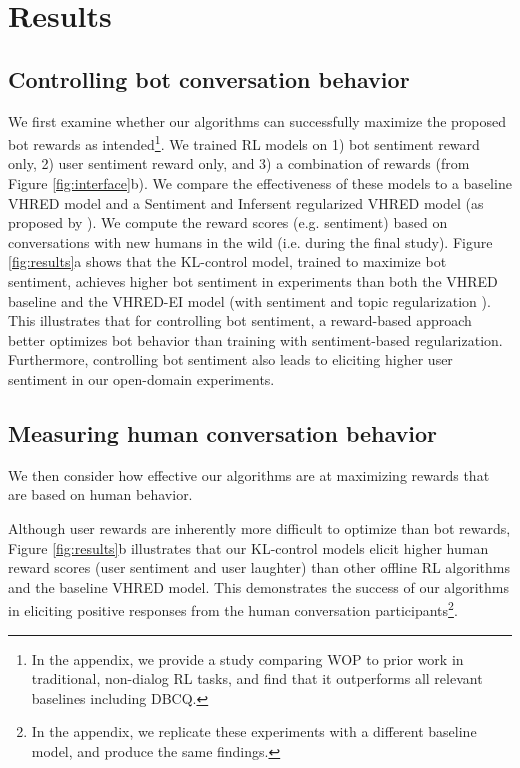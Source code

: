 \section{Results}
\label{sec:results}
\subsection{Controlling bot conversation behavior} We first examine whether our algorithms can successfully maximize the proposed bot rewards as intended\footnote{In the appendix, we provide a study comparing WOP to prior work in traditional, non-dialog RL tasks, and find that it outperforms all relevant baselines including DBCQ.}. We trained RL models on 1) bot sentiment reward only, 2) user sentiment reward only, and 3) a combination of rewards (from Figure \ref{fig:interface}b). We compare the effectiveness of these models to a baseline VHRED model and a Sentiment and Infersent regularized VHRED model (as proposed by \citet{ghandeharioun2019approximating}). We compute the reward scores (e.g. sentiment) based on conversations with new humans in the wild (i.e. during the final study). Figure \ref{fig:results}a shows that the KL-control model, trained to maximize bot sentiment, achieves higher bot sentiment in experiments than both the VHRED baseline and the VHRED-EI model (with sentiment and topic regularization \cite{ghandeharioun2019approximating}). This illustrates that for controlling bot sentiment, a reward-based approach better optimizes bot behavior than training with sentiment-based regularization. Furthermore, controlling bot sentiment also leads to eliciting higher user sentiment in our open-domain experiments.

\subsection{Measuring human conversation behavior} We then consider how effective our algorithms are at maximizing rewards that are based on human behavior. 

Although user rewards are inherently more difficult to optimize than bot rewards, Figure \ref{fig:results}b illustrates that our KL-control models elicit higher human reward scores (user sentiment and user laughter) than other offline RL algorithms and the baseline VHRED model. This demonstrates the success of our algorithms in eliciting positive responses from the human conversation participants\footnote{In the appendix, we replicate these experiments with a different baseline model, and produce the same findings.}. 

